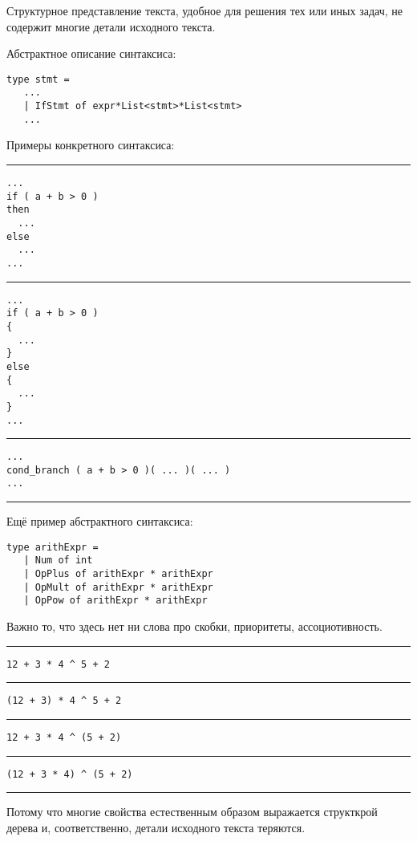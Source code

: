Структурное представление текста, удобное для решения тех или иных задач, не содержит многие детали исходного текста.

Абстрактное описание синтаксиса:
\begin{verbatim}
type stmt =
   ...
   | IfStmt of expr*List<stmt>*List<stmt>
   ...
\end{verbatim}

Примеры конкретного синтаксиса:
\hrule
\begin{verbatim}
...
if ( a + b > 0 )
then
  ...
else
  ...
...
\end{verbatim}
\hrule
\begin{verbatim}
...
if ( a + b > 0 )
{
  ...
}
else
{
  ...
}
...
\end{verbatim}
\hrule
\begin{verbatim}
...
cond_branch ( a + b > 0 )( ... )( ... )
...
\end{verbatim}
\hrule

Ещё пример абстрактного синтаксиса:

\begin{verbatim}
type arithExpr =
   | Num of int
   | OpPlus of arithExpr * arithExpr
   | OpMult of arithExpr * arithExpr
   | OpPow of arithExpr * arithExpr
\end{verbatim}

Важно то, что здесь нет ни слова про скобки, приоритеты, ассоциотивность.

\hrule
\begin{verbatim}
12 + 3 * 4 ^ 5 + 2
\end{verbatim}
\hrule
\begin{verbatim}
(12 + 3) * 4 ^ 5 + 2
\end{verbatim}
\hrule
\begin{verbatim}
12 + 3 * 4 ^ (5 + 2)
\end{verbatim}
\hrule
\begin{verbatim}
(12 + 3 * 4) ^ (5 + 2)
\end{verbatim}
\hrule

Потому что многие свойства естественным образом выражается структкрой дерева и, соответственно, детали исходного текста теряются.

